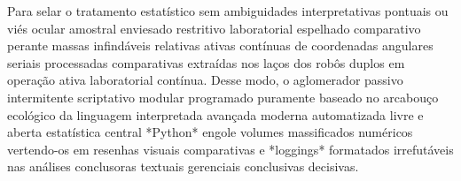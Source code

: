 Para selar o tratamento estatístico sem ambiguidades interpretativas pontuais ou viés ocular amostral enviesado restritivo laboratorial espelhado comparativo perante massas infindáveis relativas ativas contínuas de coordenadas angulares seriais processadas comparativas extraídas nos laços dos robôs duplos em operação ativa laboratorial contínua. Desse modo, o aglomerador passivo intermitente scriptativo modular programado puramente baseado no arcabouço ecológico da linguagem interpretada avançada moderna automatizada livre e aberta estatística central *Python* engole volumes massificados numéricos vertendo-os em resenhas visuais comparativas e *loggings* formatados irrefutáveis nas análises conclusoras textuais gerenciais conclusivas decisivas.
